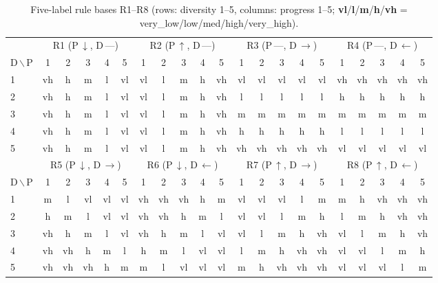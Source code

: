 \documentclass[runningheads]{llncs}
\begin{document}
\begin{table}[H]
\vspace{1pt}
\caption{Five-label rule bases R1--R8 (rows: diversity 1--5, columns: progress 1--5; \textbf{vl}/\textbf{l}/\textbf{m}/\textbf{h}/\textbf{vh} = very\_low/low/med/high/very\_high).}\label{tab:rules5L}
\setlength{\tabcolsep}{2pt}
\begin{tabular}{l|ccccc|ccccc|ccccc|ccccc}
\toprule
& \multicolumn{5}{c|}{R1 (P\,$\downarrow$, D\,---)}
& \multicolumn{5}{c|}{R2 (P\,$\uparrow$, D\,---)}
& \multicolumn{5}{c|}{R3 (P\,---, D\,$\rightarrow$)}
& \multicolumn{5}{c}{R4 (P\,---, D\,$\leftarrow$)} \\
D\,$\backslash$\,P & 1 & 2 & 3 & 4 & 5 & 1 & 2 & 3 & 4 & 5 & 1 & 2 & 3 & 4 & 5 & 1 & 2 & 3 & 4 & 5 \\
\midrule
1 & vh & h  & m  & l  & vl & vl & l  & m  & h  & vh & vl & vl & vl & vl & vl & vh & vh & vh & vh & vh \\
2 & vh & h  & m  & l  & vl & vl & l  & m  & h  & vh & l  & l  & l  & l  & l  & h  & h  & h  & h  & h  \\
3 & vh & h  & m  & l  & vl & vl & l  & m  & h  & vh & m  & m  & m  & m  & m  & m  & m  & m  & m  & m  \\
4 & vh & h  & m  & l  & vl & vl & l  & m  & h  & vh & h  & h  & h  & h  & h  & l  & l  & l  & l  & l  \\
5 & vh & h  & m  & l  & vl & vl & l  & m  & h  & vh & vh & vh & vh & vh & vh & vl & vl & vl & vl & vl \\
\bottomrule
\toprule
& \multicolumn{5}{c|}{R5 (P\,$\downarrow$, D\,$\rightarrow$)}
& \multicolumn{5}{c|}{R6 (P\,$\downarrow$, D\,$\leftarrow$)}
& \multicolumn{5}{c|}{R7 (P\,$\uparrow$, D\,$\rightarrow$)}
& \multicolumn{5}{c}{R8 (P\,$\uparrow$, D\,$\leftarrow$)} \\
D\,$\backslash$\,P & 1 & 2 & 3 & 4 & 5 & 1 & 2 & 3 & 4 & 5 & 1 & 2 & 3 & 4 & 5 & 1 & 2 & 3 & 4 & 5 \\
\midrule
1 & m  & l  & vl & vl & vl & vh & vh & vh & h  & m  & vl & vl & vl & l  & m  & m  & h  & vh & vh & vh \\
2 & h  & m  & l  & vl & vl & vh & vh & h  & m  & l  & vl & vl & l  & m  & h  & l  & m  & h  & vh & vh \\
3 & vh & h  & m  & l  & vl & vh & h  & m  & l  & vl & vl & l  & m  & h  & vh & vl & l  & m  & h  & vh \\
4 & vh & vh & h  & m  & l  & h  & m  & l  & vl & vl & l  & m  & h  & vh & vh & vl & vl & l  & m  & h  \\
5 & vh & vh & vh & h  & m  & m  & l  & vl & vl & vl & m  & h  & vh & vh & vh & vl & vl & vl & l  & m  \\
\bottomrule
\end{tabular}
\end{table}
\end{document}

